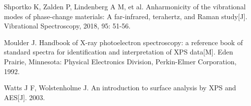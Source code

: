\begin{thebibliography}{99}
 Shportko K, Zalden P, Lindenberg A M, et al. Anharmonicity of the vibrational modes of phase-change materials: A far-infrared, terahertz, and Raman study[J]. Vibrational Spectroscopy, 2018, 95: 51-56.

 Moulder J. Handbook of X-ray photoelectron spectroscopy: a reference book of standard spectra for identification and interpretation of XPS data[M]. Eden Prairie, Minnesota: Physical Electronics Division, Perkin-Elmer Corporation, 1992.

 Watts J F, Wolstenholme J. An introduction to surface analysis by XPS and AES[J]. 2003.

\end{thebibliography}
